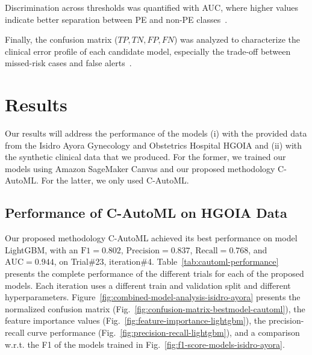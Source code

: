 \documentclass[diagnostics,article,submit,pdftex,moreauthors]{Definitions/mdpi}
\begin{document}
Discrimination across thresholds was quantified with \ac{AUC}, where
higher values indicate better separation between \ac{PE} and
non-\ac{PE} classes~\cite{fawcett2006roc}.

Finally, the confusion matrix (\(TP, TN, FP, FN\)) was analyzed to
characterize the clinical error profile of each candidate model,
especially the trade-off between missed-risk cases and false
alerts~\cite{sokolova2009systematic,powers2011evaluation}.

\section{Results}
\label{sec:results}
Our results will address the performance of the models (i) with the
provided data from the Isidro Ayora Gynecology and Obstetrics Hospital
\ac{HGOIA} and (ii) with the synthetic
clinical data that we produced. For the former, we trained our models using Amazon SageMaker Canvas and our proposed methodology \ac{C-AutoML}. For the
latter, we only used \ac{C-AutoML}.
\subsection{Performance of C-AutoML on \ac{HGOIA} Data}
\label{sec:performance-c-automl}

Our proposed methodology \ac{C-AutoML} achieved its best performance
on model LightGBM, with an $\mathrm{F1}=0.802$,
$\mathrm{Precision}=0.837$, $\mathrm{Recall}=0.768$, and
$\mathrm{AUC}=0.944$, on Trial\#23,
iteration\#4. Table~\ref{tab:cautoml-performance} presents the
complete performance of the different trials for each of the proposed
models. Each iteration uses a different train and validation split and
different
hyperparameters. Figure~\ref{fig:combined-model-analysis-isidro-ayora}
presents the normalized confusion
matrix (Fig.~\ref{fig:confusion-matrix-bestmodel-cautoml}), the feature
importance values (Fig.~\ref{fig:feature-importance-lightgbm}), the
precision-recall curve
performance (Fig.~\ref{fig:precision-recall-lightgbm}), and a comparison
\ac{w.r.t.} the \ac{F1} of the models trained
in Fig.~\ref{fig:f1-score-models-isidro-ayora}.

\end{document}
